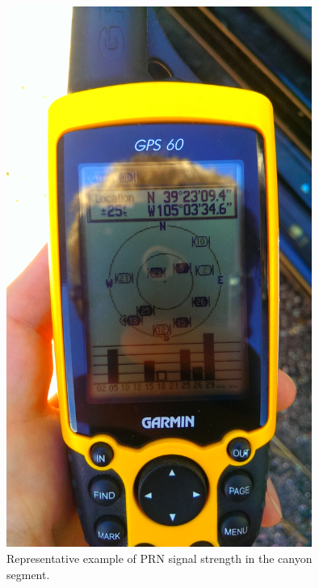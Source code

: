\documentclass[]{aiaa-tc}%
\begin{document}
	\begin{figure}[H]
		\centering
		\includegraphics[width = 10cm]{BadSignalStrength.jpg}
		\caption{Representative example of PRN signal strength in the canyon segment. }
		\label{fig:BadSignalStrength}
	\end{figure}
	
\end{document}
